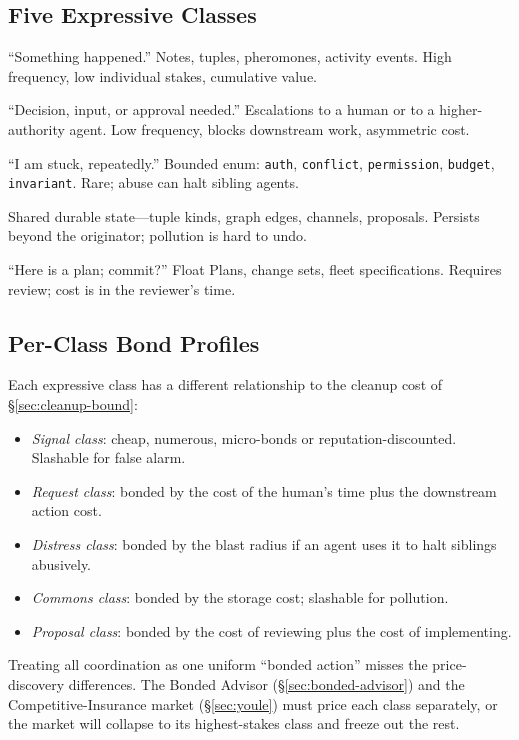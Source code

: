 \documentclass[11pt,a4paper]{article}
\theoremstyle{definition}
\theoremstyle{remark}
\begin{document}
\subsection{Five Expressive Classes}

\begin{description}[nosep]
  \item[Signal.] ``Something happened.'' Notes, tuples, pheromones, activity events. High frequency, low individual stakes, cumulative value.
  \item[Request.] ``Decision, input, or approval needed.'' Escalations to a human or to a higher-authority agent. Low frequency, blocks downstream work, asymmetric cost.
  \item[Distress.] ``I am stuck, repeatedly.'' Bounded enum: \texttt{auth}, \texttt{conflict}, \texttt{permission}, \texttt{budget}, \texttt{invariant}. Rare; abuse can halt sibling agents.
  \item[Commons.] Shared durable state---tuple kinds, graph edges, channels, proposals. Persists beyond the originator; pollution is hard to undo.
  \item[Proposal.] ``Here is a plan; commit?'' Float Plans, change sets, fleet specifications. Requires review; cost is in the reviewer's time.
\end{description}

\subsection{Per-Class Bond Profiles}

Each expressive class has a different relationship to the cleanup cost of \S\ref{sec:cleanup-bound}:
\begin{itemize}[nosep]
  \item \emph{Signal class}: cheap, numerous, micro-bonds or reputation-discounted. Slashable for false alarm.
  \item \emph{Request class}: bonded by the cost of the human's time plus the downstream action cost.
  \item \emph{Distress class}: bonded by the blast radius if an agent uses it to halt siblings abusively.
  \item \emph{Commons class}: bonded by the storage cost; slashable for pollution.
  \item \emph{Proposal class}: bonded by the cost of reviewing plus the cost of implementing.
\end{itemize}

Treating all coordination as one uniform ``bonded action'' misses the price-discovery differences. The Bonded Advisor (\S\ref{sec:bonded-advisor}) and the Competitive-Insurance market (\S\ref{sec:youle}) must price each class separately, or the market will collapse to its highest-stakes class and freeze out the rest.
\end{document}
